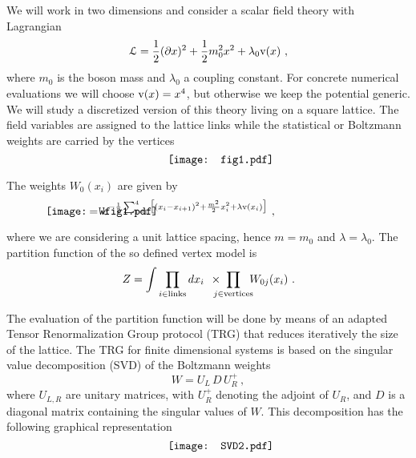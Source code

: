 \documentclass[a4paper,preprintnumbers,nofootinbib,twocolumn]{quantumarticle}
\newcommand{\be}{\begin{equation}} \newcommand{\ee}{\end{equation}}
\begin{document}
We will work in two dimensions and consider a scalar field theory with Lagrangian
\be
{\cal L}= {1 \over 2} (\partial x)^2 + {1 \over 2} m_0^2 x^2 + \lambda_0 {\rm v} (x) \ ,
\label{lagrangian}
\ee
where $m_0$ is the boson mass and $\lambda_0$ a coupling constant.
For concrete numerical evaluations we will choose ${\rm v}(x)=x^4$, but otherwise we keep the potential generic.
We will study a discretized version of this theory living on a square lattice.
The field variables are assigned to the lattice links while the statistical or Boltzmann weights are carried by the vertices
\vspace*{-3.5cm}
\begin{equation}
\hspace{0mm}  \vcenter{\hbox{\texttt{[image: fig1.pdf]}} }  \hspace{-10mm} \ .
\end{equation}
\vspace*{-3.6cm}

\noindent The weights $W_0(x_i)$ are given by
\vspace*{-3.6cm}
\be
\hspace{-30mm}  \vcenter{\hbox{\texttt{[image: Wfig1.pdf]}} } \hspace{-23mm}
\, = \, e^{-{1 \over 2} \sum_{i=1}^4 \big[ (x_i -x_{i+1})^2 + {m^2 \over 2} x_i^2 +  \lambda {\rm v}(x_i) \big]}  \ ,
\label{Wint}
\ee
\vspace*{-3.9cm}


\noindent %
where we are considering a unit lattice spacing, hence $m=m_0$ and $\lambda=\lambda_0$.
The partition function of the so defined vertex model is
\be
Z=\int \prod_{i \in {\rm links}}  d x_i \;\, \times \!\!\!\!\! \prod_{j \in {\rm vertices}} \!\!\! W_{0j}(x_i) \ .
\label{Z}
\ee

The evaluation of the partition function will be done by means of an adapted Tensor Renormalization Group protocol (TRG) that reduces iteratively the size of the lattice. 
The TRG  for finite dimensional systems is based on the singular value decomposition (SVD) of the Boltzmann weights \cite{LN07}
\be
W=U_L\, D\, U_R^+ \ , 
\ee
where $U_{L,R}$ are unitary matrices, with $U_R^+$ denoting the adjoint of $U_R$, and $D$ is a diagonal matrix containing the singular values of $W$.
This decomposition has the following graphical representation
\vspace*{-1.8cm}
\begin{equation}
  \vcenter{\hbox{\texttt{[image: SVD2.pdf]}} }   \hspace{-10mm} \ .
\label{TRGfig}
\end{equation}
\vspace*{-2.1cm}
\end{document}
